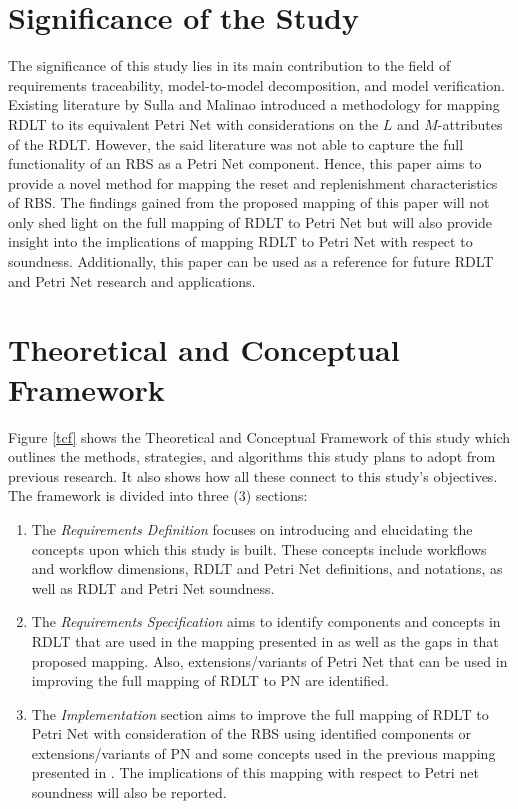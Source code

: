 \documentclass[12pt]{article}
\begin{document}
    \section{Significance of the Study}
    The significance of this study lies in its main contribution to the field of requirements traceability, model-to-model decomposition, and model verification. Existing literature by Sulla and Malinao \cite{sulla-malinao} introduced a methodology for mapping RDLT to its equivalent Petri Net with considerations on the $L$ and $M$-attributes of the RDLT. However, the said literature was not able to capture the full functionality of an RBS as a Petri Net component. Hence, this paper aims to provide a novel method for mapping the reset and replenishment characteristics of RBS. The findings gained from the proposed mapping of this paper will not only shed light on the full mapping of RDLT to Petri Net but will also provide insight into the implications of mapping RDLT to Petri Net with respect to soundness. Additionally, this paper can be used as a reference for future RDLT and Petri Net research and applications.

    \section{Theoretical and Conceptual Framework}
    Figure \ref{tcf} shows the Theoretical and Conceptual Framework of this study which outlines the methods, strategies, and algorithms this study plans to adopt from previous research. It also shows how all these connect to this study's objectives. The framework is divided into three (3) sections:

    \begin{enumerate}
        \item The \textit{Requirements Definition} focuses on introducing and elucidating the concepts upon which this study is built. These concepts include workflows and workflow dimensions, RDLT and Petri Net definitions, and notations, as well as RDLT and Petri Net soundness.
        \item The \textit{Requirements Specification} aims to identify components and concepts in RDLT that are used in the mapping presented in \cite{sulla-malinao} as well as the gaps in that proposed mapping. Also, extensions/variants of Petri Net that can be used in improving the full mapping of RDLT to PN are identified.
        \item The \textit{Implementation} section aims to improve the full mapping of RDLT to Petri Net with consideration of the RBS using identified components or extensions/variants of PN and some concepts used in the previous mapping presented in \cite{sulla-malinao}. The implications of this mapping with respect to Petri net soundness will also be reported.
    \end{enumerate}
\end{document}
